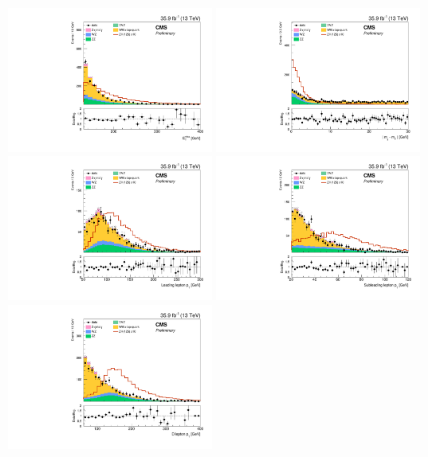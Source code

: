 \begin{figure}[htbp]
\begin{center}
\includegraphics[width=0.48\textwidth]{figures/mva_MET_nice.pdf}
\includegraphics[width=0.48\textwidth]{figures/mva_mll_minus_mZ_nice.pdf}
\includegraphics[width=0.48\textwidth]{figures/mva_ptl1_nice.pdf}
\includegraphics[width=0.48\textwidth]{figures/mva_ptl2_nice.pdf}
\includegraphics[width=0.48\textwidth]{figures/mva_ptll_nice.pdf}

\end{center}
\end{figure}
